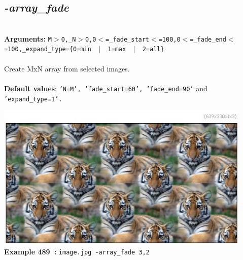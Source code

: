 \documentclass[a4paper,11pt,twoside]{book}
\begin{document}
\subsection{\emph{-array\_fade} }\vspace*{-0.5em}
~\\\textbf{Arguments: } 
{\small \texttt{M$>$0,\_N$>$0,0$<$=\_fade\_start$<$=100,0$<$=\_fade\_end$<$=100,\_expand\_type=\{0=min ~$|$~ 1=max ~$|$~ 2=all\}}}\\~\\
Create MxN array from selected images.
~\\~\\\textbf{Default values}: {\small \texttt{'N=M', 'fade\_start=60', 'fade\_end=90'} and \texttt{'expand\_type=1'.}}
\begin{center}\includegraphics[keepaspectratio=true,height=7cm,width=\textwidth]{img/gmic_def489.jpg}\\
{\footnotesize \textbf{Example 489~:} \texttt{image.jpg -array\_fade 3,2}}
\end{center}
\end{document}
